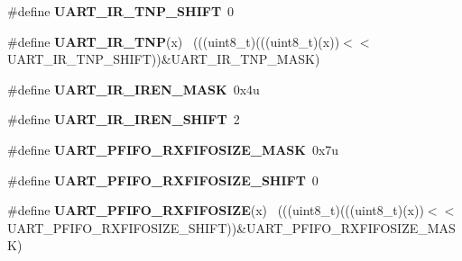 \begin{DoxyCompactItemize}
\item 
\hypertarget{group___u_a_r_t___register___masks_gafc08f087483347c37c3051f6c86d2beb}{}\#define {\bfseries U\+A\+R\+T\+\_\+\+I\+R\+\_\+\+T\+N\+P\+\_\+\+S\+H\+I\+F\+T}~0\label{group___u_a_r_t___register___masks_gafc08f087483347c37c3051f6c86d2beb}

\item 
\hypertarget{group___u_a_r_t___register___masks_ga0b1313b20737a0cc2211c37b6627cead}{}\#define {\bfseries U\+A\+R\+T\+\_\+\+I\+R\+\_\+\+T\+N\+P}(x)                                                  ~(((uint8\+\_\+t)(((uint8\+\_\+t)(x))$<$$<$U\+A\+R\+T\+\_\+\+I\+R\+\_\+\+T\+N\+P\+\_\+\+S\+H\+I\+F\+T))\&U\+A\+R\+T\+\_\+\+I\+R\+\_\+\+T\+N\+P\+\_\+\+M\+A\+S\+K)\label{group___u_a_r_t___register___masks_ga0b1313b20737a0cc2211c37b6627cead}

\item 
\hypertarget{group___u_a_r_t___register___masks_gafb25f2545b505763066c9f30ff7447f0}{}\#define {\bfseries U\+A\+R\+T\+\_\+\+I\+R\+\_\+\+I\+R\+E\+N\+\_\+\+M\+A\+S\+K}~0x4u\label{group___u_a_r_t___register___masks_gafb25f2545b505763066c9f30ff7447f0}

\item 
\hypertarget{group___u_a_r_t___register___masks_ga674f392636537dcd6dd92309bead60b9}{}\#define {\bfseries U\+A\+R\+T\+\_\+\+I\+R\+\_\+\+I\+R\+E\+N\+\_\+\+S\+H\+I\+F\+T}~2\label{group___u_a_r_t___register___masks_ga674f392636537dcd6dd92309bead60b9}

\item 
\hypertarget{group___u_a_r_t___register___masks_gaf6314eec454a532d9baf2eff4ea61204}{}\#define {\bfseries U\+A\+R\+T\+\_\+\+P\+F\+I\+F\+O\+\_\+\+R\+X\+F\+I\+F\+O\+S\+I\+Z\+E\+\_\+\+M\+A\+S\+K}~0x7u\label{group___u_a_r_t___register___masks_gaf6314eec454a532d9baf2eff4ea61204}

\item 
\hypertarget{group___u_a_r_t___register___masks_gae4811b6796cb32adc0f9d172e9748e75}{}\#define {\bfseries U\+A\+R\+T\+\_\+\+P\+F\+I\+F\+O\+\_\+\+R\+X\+F\+I\+F\+O\+S\+I\+Z\+E\+\_\+\+S\+H\+I\+F\+T}~0\label{group___u_a_r_t___register___masks_gae4811b6796cb32adc0f9d172e9748e75}

\item 
\hypertarget{group___u_a_r_t___register___masks_gafd77c1537fe2b93d5ea7dd24c8cec96a}{}\#define {\bfseries U\+A\+R\+T\+\_\+\+P\+F\+I\+F\+O\+\_\+\+R\+X\+F\+I\+F\+O\+S\+I\+Z\+E}(x)                              ~(((uint8\+\_\+t)(((uint8\+\_\+t)(x))$<$$<$U\+A\+R\+T\+\_\+\+P\+F\+I\+F\+O\+\_\+\+R\+X\+F\+I\+F\+O\+S\+I\+Z\+E\+\_\+\+S\+H\+I\+F\+T))\&U\+A\+R\+T\+\_\+\+P\+F\+I\+F\+O\+\_\+\+R\+X\+F\+I\+F\+O\+S\+I\+Z\+E\+\_\+\+M\+A\+S\+K)\label{group___u_a_r_t___register___masks_gafd77c1537fe2b93d5ea7dd24c8cec96a}


\end{DoxyCompactItemize}
